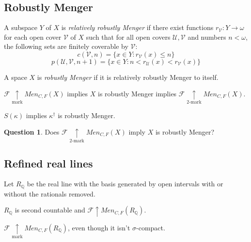 \documentclass{beamer}
\theoremstyle{example}
\theoremstyle{definition}
\newtheorem{question}[theorem]{Question}
\newcommand{\win}{\uparrow}
\newcommand{\markwin}{\underset{\text{mark}}{\uparrow}}
\newcommand{\kmarkwin}[1]{\underset{#1\text{-mark}}{\uparrow}}
\newcommand{\oneptlind}[1]{#1^\dagger} %
\newcommand{\menGame}[1]{Men_{C,F}\left({#1}\right)}
\newcommand{\<}{\langle}
\renewcommand{\>}{\rangle}
\newcommand{\mc}[1]{\mathcal{#1}}
\newcommand{\mb}[1]{\mathbb{#1}}
\newcommand{\alcompS}[1]{S(#1)}
\newcommand{\pl}[1]{\mathscr{#1}}
\newcommand{\term}{\textit}
\begin{document}
\subsection{Robustly Menger}

\begin{frame}
  \begin{definition}
    A subspace \(Y\) of \(X\) is \term{relatively robustly Menger}
    if there exist functions \(r_{\mc V}:Y\to\omega\)
    for each open cover \(\mc V\) of \(X\) such that
    for all open covers \(\mc U,\mc V\) and numbers \(n<\omega\),
    the following sets are finitely coverable by \(\mc V\):
      \[
        c(\mc V,n)=\{ x\in Y : r_{\mc V}(x)\leq n\}
      \]
      \[
        p(\mc U,\mc V,n+1)=\{ x\in Y : n<r_{\mc U}(x)<r_{\mc V}(x)\}
      \]
  \end{definition}

  \begin{definition}
    A space \(X\) is \term{robustly Menger} if it is relatively robustly
    Menger to itself.
  \end{definition}
\end{frame}

\begin{frame}
  \begin{theorem}
    \(\pl F\markwin\menGame{X}\) implies
    \(X\) is robustly Menger implies
    \(\pl F\kmarkwin{2}\menGame{X}\).
  \end{theorem}

  \pause

  \begin{theorem}
    $\alcompS\kappa$ implies $\oneptlind\kappa$ is robustly Menger.
  \end{theorem}

  \pause

  \begin{question}
    Does \(\pl F\kmarkwin{2}\menGame{X}\) imply
    \(X\) is robustly Menger?
  \end{question}
\end{frame}

\subsection{Refined real lines}

\begin{frame}
  \begin{example}
    Let \(R_{\mb Q}\) be the real line with the basis generated by
    open intervals with or without the rationals removed.
  \end{example}

  \pause

  \begin{theorem}
    \(R_{\mb Q}\) is second countable and
    \(\pl F\win\menGame{R_{\mb Q}}\).
  \end{theorem}

  \begin{corollary}
    \(\pl F\markwin\menGame{R_{\mb Q}}\), even though it isn't
    \(\sigma\)-compact.
  \end{corollary}
\end{frame}
\end{document}
